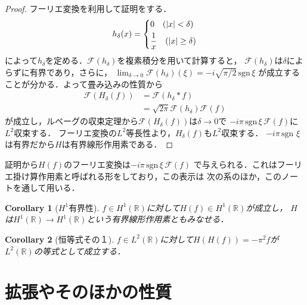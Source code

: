 \documentclass[dvipdfmx,autodetect-engine]{jsarticle}
\newtheorem{corollary}{Corollary}[theorem]
\theoremstyle{remark}
\theoremstyle{definition}
\newcommand{\R}{\mathbb{R}}
\newcommand{\sgn}{\mathrm{sgn} \,}
\begin{document}
\begin{proof}
    フーリエ変換を利用して証明をする．
    \begin{align}
        h_{\delta}(x) = 
        \begin{dcases}
            0\quad (\lvert x \rvert < \delta) \\
            \frac{1}{x} \quad (\lvert x \rvert \geq \delta)
        \end{dcases}
    \end{align}
    によって$h_\delta$を定める．$\mathcal{F}(h_\delta)$を複素積分を用いて計算すると，
    $\mathcal{F}(h_\delta)$は$\delta$によらずに有界であり，さらに，
    $\lim_{\delta \to 0} \mathcal{F}(h_\delta) (\xi) = -i \sqrt{\pi / 2} \, \sgn \xi$
    が成立することが分かる．よって畳み込みの性質から
    \begin{align}
        \mathcal{F}(H_\delta (f)) &= \mathcal{F} (h_\delta \ast f) \\
            &= \sqrt{2\pi} \mathcal{F}(h_\delta) \mathcal{F}(f)
    \end{align}
    が成立し，ルベーグの収束定理から$\mathcal{F}(H_\delta (f))$は$\delta\to 0$で
    $-i \pi \, \sgn \xi \, \mathcal{F}(f)$に$L^2$収束する．
    フーリエ変換の$L^2$等長性より，$H_\delta (f)$も$L^2$収束する．
    $-i \pi \, \sgn \, \xi$は有界だから$H$は有界線形作用素である．
\end{proof}

証明から$H(f)$のフーリエ変換は$-i \pi \, \sgn \xi \, \mathcal{F}(f)$
で与えられる．これはフーリエ掛け算作用素と呼ばれる形をしており，この表示は
次の系のほか，このノートを通して用いる．

\begin{corollary}[$H^1$有界性]
    $f \in H^1(\R)$に対して$H(f) \in H^1(\R)$が成立し，
    $H$は$H^1(\R) \to H^1(\R)$という有界線形作用素ともみなせる．
\end{corollary}

\begin{corollary}[恒等式その１]
    $f \in L^2(\R)$に対して$H(H(f)) = -\pi^2 f$が$L^2(\R)$の等式として成立する．
\end{corollary}
\section{拡張やそのほかの性質}
    
\end{document}
